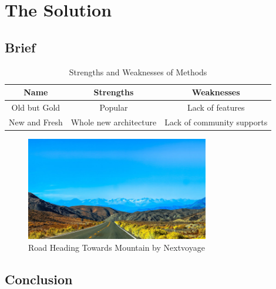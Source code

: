 \chapter{The Solution}



\section{Brief}

\blindtext

\begin{table}[ht]
    \centering
        \begin{tabular}{c | c | c}
            Name & Strengths & Weaknesses \\
            \hline
            Old but Gold & Popular & Lack of features \\
            New and Fresh & Whole new architecture & Lack of community supports
        \end{tabular}
    \caption{Strengths and Weaknesses of Methods}
    \label{tab:method summary}
\end{table}

\blindtext

\begin{figure}[ht]
    \centering
    \includegraphics[width=8cm]{img/nextvoyage-road-moutain.jpg}
    \caption{Road Heading Towards Mountain by Nextvoyage}
    \label{fig:purple flower}
\end{figure}

\blindtext



\section{Conclusion}

\Blindtext[2]
